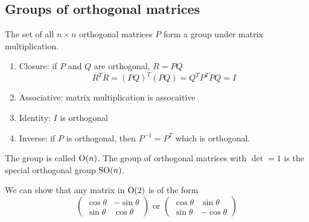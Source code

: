 \documentclass{article}
\numberwithin{equation}{section}
\begin{document}
\subsection{Groups of orthogonal matrices}
The set of all $n \times n$ orthogonal matrices $P$ form a group under matrix multiplication.
\begin{enumerate}
    \item Closure: if $P$ and $Q$ are orthogonal, $R = PQ$
    \[
        R^TR = (PQ)^T(PQ) = Q^TP^TPQ = I  
    \]
    \item Associative: matrix multiplication is assocaitive
    \item Identity: $I$ is orthogonal
    \item Inverse: if $P$ is orthogonal, then $P^{-1} = P^T$ which is orthogonal.
\end{enumerate}
The group is called $\mathrm{O}(n)$. 
The group of orthogonal matrices with $\det = 1$ is the special orthogonal group $\mathrm{SO}(n)$.

We can show that any matrix in $\mathrm{O}(2)$ is of the form
\[
    \begin{pmatrix}
        \cos \theta & - \sin \theta \\
        \sin \theta & \cos \theta
    \end{pmatrix}
    \text{ or }
    \begin{pmatrix}
        \cos \theta & \sin \theta \\
        \sin \theta & -\cos \theta
    \end{pmatrix}
\]
\end{document}
